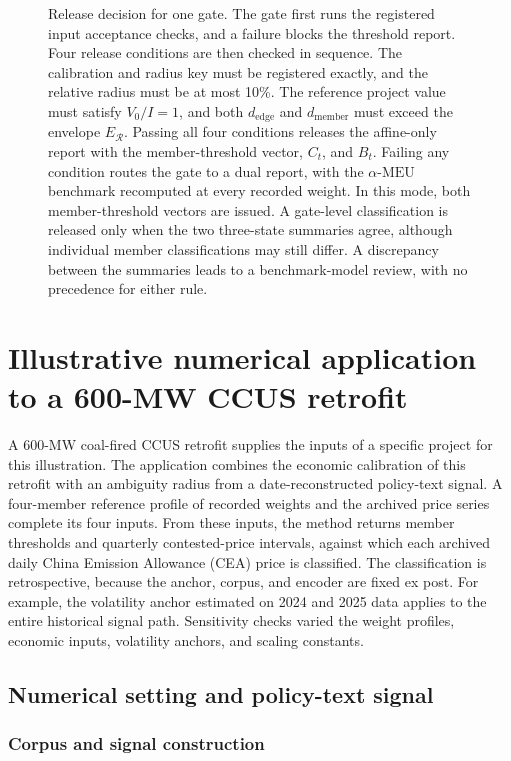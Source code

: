 \documentclass[5p,times,authoryear]{elsarticle}
\theoremstyle{plain}
\newcommand{\aMEU}{\alpha\text{-MEU}}
\newcommand{\ER}{E_{\mathcal{R}}}
\newcommand{\dedge}{d_{\mathrm{edge}}}
\newcommand{\dmember}{d_{\mathrm{member}}}
\begin{document}
\begin{figure}[!t]
{\begin{tikzpicture}
\end{tikzpicture}}
\caption{Release decision for one gate. The gate first runs the registered input acceptance checks, and a failure blocks the threshold report. Four release conditions are then checked in sequence. The calibration and radius key must be registered exactly, and the relative radius must be at most 10\%. The reference project value must satisfy $V_0/I=1$, and both $\dedge$ and $\dmember$ must exceed the envelope $\ER$. Passing all four conditions releases the affine-only report with the member-threshold vector, $C_t$, and $B_t$. Failing any condition routes the gate to a dual report, with the $\aMEU$ benchmark recomputed at every recorded weight. In this mode, both member-threshold vectors are issued. A gate-level classification is released only when the two three-state summaries agree, although individual member classifications may still differ. A discrepancy between the summaries leads to a benchmark-model review, with no precedence for either rule.}
\label{fig:release}
\end{figure}

\section{Illustrative numerical application to a 600-MW CCUS retrofit}

A 600-MW coal-fired CCUS retrofit supplies the inputs of a specific project for this illustration. The application combines the economic calibration of this retrofit with an ambiguity radius from a date-reconstructed policy-text signal. A four-member reference profile of recorded weights and the archived price series complete its four inputs. From these inputs, the method returns member thresholds and quarterly contested-price intervals, against which each archived daily China Emission Allowance (CEA) price is classified. The classification is retrospective, because the anchor, corpus, and encoder are fixed ex post. For example, the volatility anchor estimated on 2024 and 2025 data applies to the entire historical signal path. Sensitivity checks varied the weight profiles, economic inputs, volatility anchors, and scaling constants.

\subsection{Numerical setting and policy-text signal}

\subsubsection{Corpus and signal construction}
\end{document}
